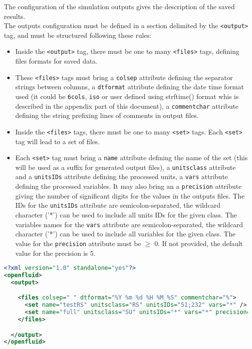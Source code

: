 The configuration of the simulation outputs gives the description of the saved
results.\\
\noindent The outputs configuration must be defined in a section delimited by
the \texttt{<output>} tag, and must be structured following these rules:
\begin{itemize}
  \item Inside the \texttt{<output>} tag, there must be one to many
  \texttt{<files>} tags, defining files formats for saved data.
  \item These \texttt{<files>} tags must bring a \texttt{colsep} attribute
  defining the separator strings between columns, a \texttt{dtformat} attribute
  defining the date time format used (it could be \texttt{6cols}, \texttt{iso}
  or user defined using strftime() format whis is described in the appendix
  part of this document), a \texttt{commentchar} attribute defining the string
  prefixing lines of comments in output files.
  \item Inside the \texttt{<files>} tags, there must be one to many
  \texttt{<set>} tags. Each \texttt{<set>} tag will lead to a set of files.
  \item Each \texttt{<set>} tag must bring a \texttt{name} attribute defining
  the name of the set (this will be used as a suffix for generated output
  files), a \texttt{unitsclass} attribute and a \texttt{unitsIDs} attribute
  defining the processed units, a \texttt{vars} attribute defining the
  processed variables. It may also bring an a \texttt{precision} attribute
  giving the number of significant digits for the values in the outputs files.
  The IDs for the \texttt{unitsIDs} attribute are semicolon-separated, the
  wildcard character ('*') can be used to include all units IDs for the given
  class. The variables names for the \texttt{vars} attribute are
  semicolon-separated, the wildcard character ('*') can be used to include all
  variables for the given class. The value for the \texttt{precision} attribute
  must be $\geq$ 0. If not provided, the default value for the precision is 5.
\end{itemize}


\begin{lstlisting}[language=xml,title=\footnotesize\textit{example}]
<?xml version="1.0" standalone="yes"?>
<openfluid>
  <output>

    <files colsep=" " dtformat="%Y %m %d %H %M %S" commentchar="%">     
      <set name="testRS" unitsclass="RS" unitsIDs="51;232" vars="*" />
      <set name="full" unitsclass="SU" unitsIDs="*" vars="*" precision="7"/>
    </files>  

  </output>
</openfluid>
\end{lstlisting}

